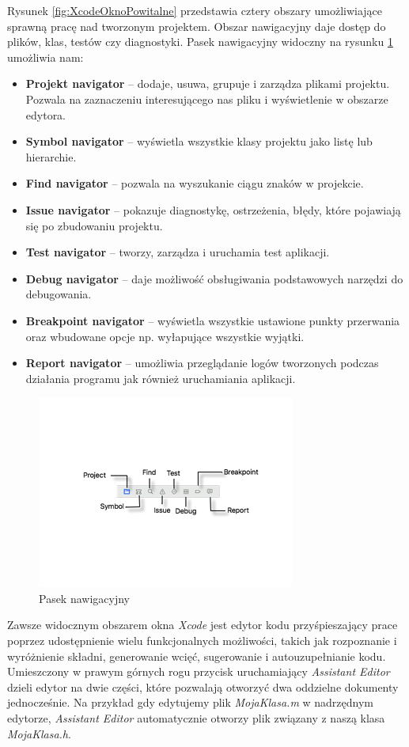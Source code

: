 \documentclass{iiuwb}
\begin{document}
Rysunek \ref{fig:XcodeOknoPowitalne} przedstawia cztery obszary umożliwiające sprawną pracę nad tworzonym projektem. Obszar nawigacyjny daje dostęp do plików, klas, testów czy diagnostyki. Pasek nawigacyjny widoczny na rysunku \ref{fig:XcodeNavigationBar} umożliwia nam:
\begin{itemize}
\item \textbf{Projekt navigator} -- dodaje, usuwa, grupuje i zarządza plikami projektu. Pozwala na zaznaczeniu interesującego nas pliku i wyświetlenie w obszarze edytora. 
\item \textbf{Symbol navigator} -- wyświetla wszystkie klasy projektu jako listę lub hierarchie.
\item \textbf{Find navigator} -- pozwala na wyszukanie ciągu znaków w projekcie. 
\item \textbf{Issue navigator} -- pokazuje diagnostykę, ostrzeżenia, błędy, które pojawiają się po zbudowaniu projektu.
\item \textbf{Test navigator} -- tworzy, zarządza i uruchamia test aplikacji.
\item \textbf{Debug navigator} -- daje możliwość obsługiwania podstawowych narzędzi do debugowania.
\item \textbf{Breakpoint navigator} -- wyświetla wszystkie ustawione punkty przerwania oraz wbudowane opcje np. wyłapujące wszystkie wyjątki.
\item \textbf{Report navigator} -- umożliwia przeglądanie logów tworzonych podczas działania programu jak również uruchamiania aplikacji.
\end{itemize}
\begin{figure}[!th]
\centering
\includegraphics[scale=.7]{image/XcodeNavigationBar.png}
\caption{Pasek nawigacyjny}
\label{fig:XcodeNavigationBar}
\end{figure}

Zawsze widocznym obszarem okna \textit{Xcode} jest edytor kodu przyśpieszający prace poprzez udostępnienie wielu funkcjonalnych możliwości, takich jak rozpoznanie i wyróżnienie składni, generowanie wcięć, sugerowanie i autouzupełnianie kodu. Umieszczony w prawym górnych rogu przycisk uruchamiający \textit{Assistant Editor} dzieli edytor na dwie części, które pozwalają otworzyć dwa oddzielne dokumenty jednocześnie. Na przykład gdy edytujemy plik \emph{MojaKlasa.m} w nadrzędnym edytorze, \textit{Assistant Editor} automatycznie otworzy plik związany z naszą klasa \emph{MojaKlasa.h}.
\end{document}
